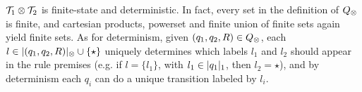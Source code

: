 %

\begin{remark}
\label{rem:syncp-fin-det}
$\mathcal{T}_1 \otimes \mathcal{T}_2$ is finite-state and deterministic. In fact, every set in the definition of $Q_{\otimes}$ is finite, and cartesian products, powerset and finite union of finite sets again yield finite sets. As for determinism, given $(q_1,q_2,R) \in Q_{\otimes}$, each $l \in |(q_1,q_2,R)|_{\otimes} \cup \{\star\}$ uniquely determines which labels $l_1$ and $l_2$ should appear in the rule premises (e.g. if $l = \{l_1\}$, with $l_1 \in |q_1|_1$, then $l_2 = \star$), and by determinism each $q_i$ can do a unique transition labeled by $l_i$.
\end{remark}
%



%



